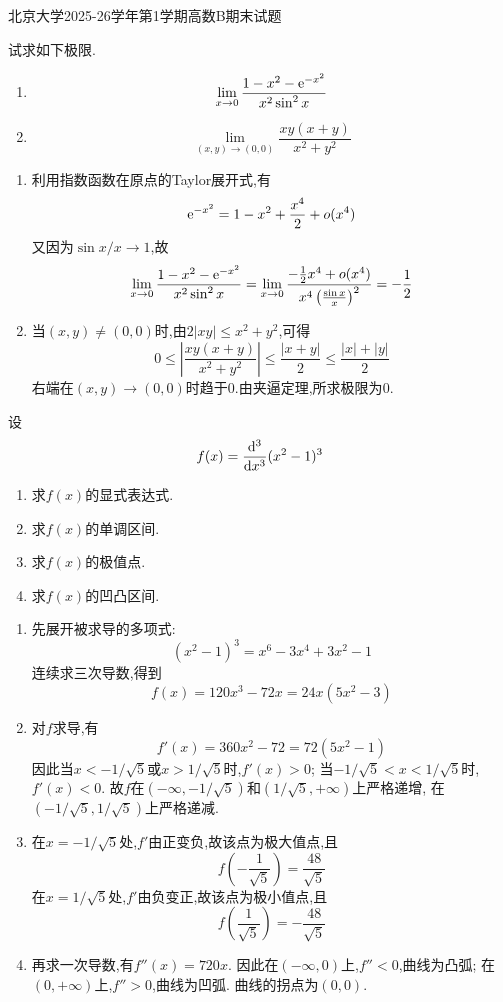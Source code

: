 \documentclass{ctexart}
\begin{document}
\pagestyle{empty}
\begin{center}\Large
北京大学2025-26学年第1学期高数B期末试题
\end{center}
\begin{problem}[1.]
试求如下极限.
\begin{enumerate}[label=\tbf{(\alph*)},leftmargin=*,topsep=0pt,parsep=0pt,itemsep=0pt,partopsep=0pt]
\item \[\lim_{x\to0}\dfrac{1-x^2-\mathrm{e}^{-x^2}}{x^2\sin^2x}\]
\item \[\lim_{(x,y)\to(0,0)}\dfrac{xy(x+y)}{x^2+y^2}\]
\end{enumerate}
\end{problem}
\begin{solution}
\begin{enumerate}[label=\tbf{(\alph*)},leftmargin=*]
\item 利用指数函数在原点的Taylor展开式,有
\[\mathrm{e}^{-x^2}=1-x^2+\dfrac{x^4}{2}+o(x^4)\]
又因为$\sin x/x\to1$,故
\[\lim_{x\to0}\dfrac{1-x^2-\mathrm{e}^{-x^2}}{x^2\sin^2x}
=\lim_{x\to0}\dfrac{-\frac12x^4+o(x^4)}{x^4\left(\frac{\sin x}{x}\right)^2}
=-\dfrac12\]
\item 当$(x,y)\ne(0,0)$时,由$2|xy|\leqslant x^2+y^2$,可得
\[0\leqslant\left|\dfrac{xy(x+y)}{x^2+y^2}\right|
\leqslant\dfrac{|x+y|}{2}
\leqslant\dfrac{|x|+|y|}{2}\]
右端在$(x,y)\to(0,0)$时趋于$0$.由夹逼定理,所求极限为$0$.
\end{enumerate}
\end{solution}
\begin{problem}[2.]
设
\[f(x)=\dfrac{\mathrm{d}^3}{\mathrm{d} x^3}(x^2-1)^3\]
\begin{enumerate}[label=\tbf{(\alph*)},leftmargin=*,topsep=0pt,parsep=0pt,itemsep=0pt,partopsep=0pt]
\item 求$f(x)$的显式表达式.
\item 求$f(x)$的单调区间.
\item 求$f(x)$的极值点.
\item 求$f(x)$的凹凸区间.
\end{enumerate}
\end{problem}
\begin{solution}
\begin{enumerate}[label=\tbf{(\alph*)},leftmargin=*]
\item 先展开被求导的多项式:
\[(x^2-1)^3=x^6-3x^4+3x^2-1\]
连续求三次导数,得到
\[f(x)=120x^3-72x=24x(5x^2-3)\]
\item 对$f$求导,有
\[f'(x)=360x^2-72=72(5x^2-1)\]
因此当$x<-1/\sqrt5$或$x>1/\sqrt5$时,$f'(x)>0$;
当$-1/\sqrt5<x<1/\sqrt5$时,$f'(x)<0$.
故$f$在$(-\infty,-1/\sqrt5)$和$(1/\sqrt5,+\infty)$上严格递增,
在$(-1/\sqrt5,1/\sqrt5)$上严格递减.
\item 在$x=-1/\sqrt5$处,$f'$由正变负,故该点为极大值点,且
\[f\left(-\dfrac1{\sqrt5}\right)=\dfrac{48}{\sqrt5}\]
在$x=1/\sqrt5$处,$f'$由负变正,故该点为极小值点,且
\[f\left(\dfrac1{\sqrt5}\right)=-\dfrac{48}{\sqrt5}\]
\item 再求一次导数,有$f''(x)=720x$.
因此在$(-\infty,0)$上,$f''<0$,曲线为凸弧;
在$(0,+\infty)$上,$f''>0$,曲线为凹弧.
曲线的拐点为$(0,0)$.
\end{enumerate}
\end{solution}
\end{document}
